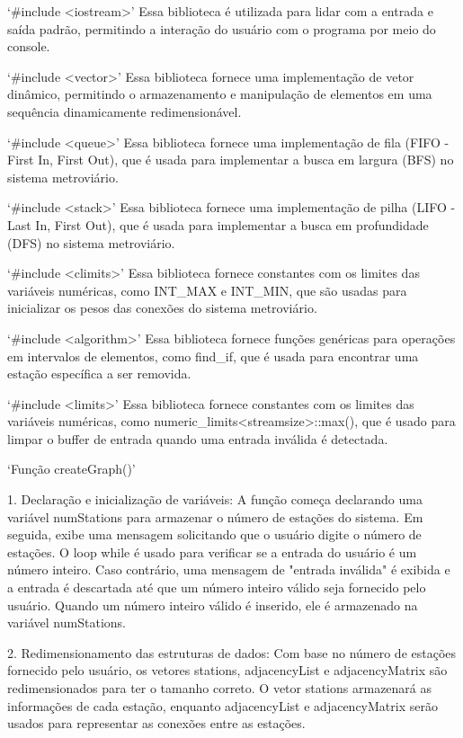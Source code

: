 `#include <iostream>'
Essa biblioteca é utilizada para lidar com a entrada e saída padrão, 
permitindo a interação do usuário com o programa por meio do console.

`#include <vector>'
Essa biblioteca fornece uma implementação de vetor dinâmico, 
permitindo o armazenamento e manipulação de elementos em uma sequência dinamicamente
redimensionável.

`#include <queue>'
Essa biblioteca fornece uma implementação de fila (FIFO - First In, First Out), 
que é usada para implementar a busca em largura (BFS) no sistema metroviário.

`#include <stack>'
Essa biblioteca fornece uma implementação de pilha (LIFO - Last In, First Out), 
que é usada para implementar a busca em profundidade (DFS) no sistema metroviário.

`#include <climits>'
Essa biblioteca fornece constantes com os limites das variáveis numéricas, como INT_MAX e INT_MIN, 
que são usadas para inicializar os pesos das conexões do sistema metroviário.

`#include <algorithm>'
Essa biblioteca fornece funções genéricas para operações em intervalos de elementos, 
como find_if, que é usada para encontrar uma estação específica a ser removida.

`#include <limits>'
Essa biblioteca fornece constantes com os limites das variáveis numéricas, 
como numeric_limits<streamsize>::max(), 
que é usado para limpar o buffer de entrada quando uma entrada inválida é detectada.



`Função createGraph()'

1. Declaração e inicialização de variáveis:
A função começa declarando uma variável numStations para armazenar o número de estações do sistema.
Em seguida, exibe uma mensagem solicitando que o usuário digite o número de estações.
O loop while é usado para verificar se a entrada do usuário é um número inteiro. 
Caso contrário, uma mensagem de "entrada inválida" é exibida e a entrada é descartada até que um número inteiro válido seja fornecido pelo usuário.
Quando um número inteiro válido é inserido, ele é armazenado na variável numStations.

2. Redimensionamento das estruturas de dados:
Com base no número de estações fornecido pelo usuário, os vetores stations, adjacencyList e adjacencyMatrix são redimensionados para ter o tamanho correto.
O vetor stations armazenará as informações de cada estação, enquanto adjacencyList e adjacencyMatrix serão usados para representar as conexões entre as estações.

